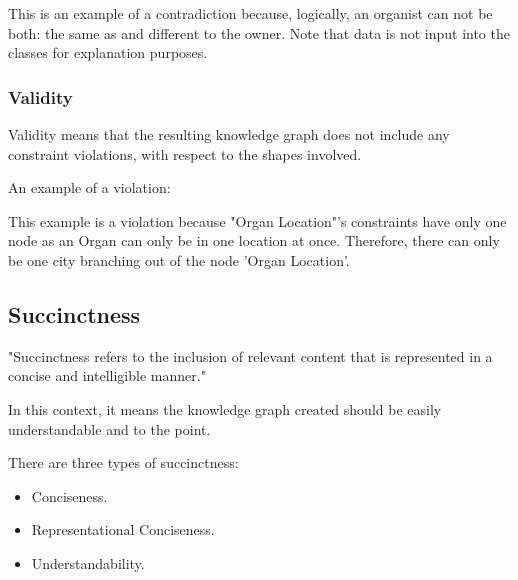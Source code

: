 This is an example of a contradiction because, logically, an organist can not be both: the same as and different to the owner. Note that data is not input into the classes for explanation purposes.

\subsubsection{Validity}
\hspace{0.5cm} Validity means that the resulting knowledge graph does not include any constraint violations, with respect to the shapes involved. \cite{knowledgegraphevaulationbook}

An example of a violation:
\begin{center}
\end{center}

This example is a violation because "Organ Location"'s constraints have only one node as an Organ can only be in one location at once. Therefore, there can only be one city branching out of the node 'Organ Location'.

\subsection{Succinctness}
\hspace{0.5cm} "Succinctness refers to the inclusion of relevant content that is represented in a concise and intelligible manner." \cite{knowledgegraphevaulationbook}

In this context, it means the knowledge graph created should be easily understandable and to the point. 

There are three types of succinctness: 
\begin{itemize}
    \itemsep0em 
\item Conciseness.
\item Representational Conciseness.
\item Understandability.
\end{itemize}

